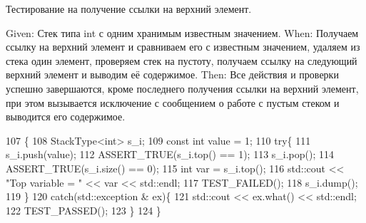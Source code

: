 Тестирование на получение ссылки на верхний элемент. 

Given\+: Стек типа int с одним хранимым известным значением. When\+: Получаем ссылку на верхний элемент и сравниваем его с известным значением, удаляем из стека один элемент, проверяем стек на пустоту, получаем ссылку на следующий верхний элемент и выводим её содержимое. Then\+: Все действия и проверки успешно завершаются, кроме последнего получения ссылки на верхний элемент, при этом вызывается исключение с сообщением о работе с пустым стеком и выводится его содержимое. 
\begin{DoxyCode}
107                   \{
108         StackType<int> s\_i;
109         \textcolor{keyword}{const} \textcolor{keywordtype}{int} value = 1;
110         \textcolor{keywordflow}{try}\{
111             s\_i.push(value);
112             ASSERT\_TRUE(s\_i.top() == 1);
113             s\_i.pop();
114             ASSERT\_TRUE(s\_i.size() == 0);
115             \textcolor{keywordtype}{int} var = s\_i.top();
116             std::cout << \textcolor{stringliteral}{"Top variable = "} << var << std::endl;
117             TEST\_FAILED();
118             s\_i.dump();
119         \}
120         \textcolor{keywordflow}{catch}(std::exception & ex)\{
121             std::cout << ex.what() << std::endl;
122             TEST\_PASSED();
123         \}
124     \}
\end{DoxyCode}
